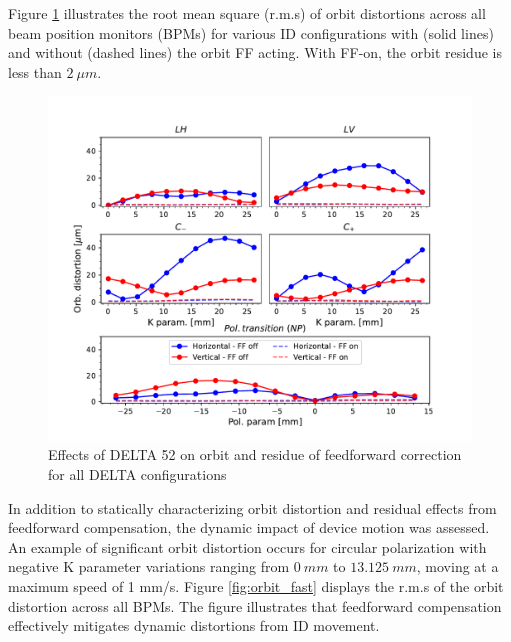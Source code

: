 \documentclass[a4paper,
               keeplastbox,   %
               ]{jacow}
\begin{document}
Figure \ref{fig:orbit_slow} illustrates the root mean square (r.m.s) of orbit distortions across all beam position monitors (BPMs) for various ID configurations with (solid lines) and without (dashed lines) the orbit FF acting. With FF-on,  the orbit residue is less than $\SI{2}{\mu m}$.

\begin{figure}[!h]
    \centering
   \includegraphics[width=\columnwidth]{Orbit_dist.pdf}
   \caption{Effects of DELTA 52 on orbit and residue of feedforward correction for all DELTA configurations}
   \label{fig:orbit_slow}
\end{figure}

In addition to statically characterizing orbit distortion and residual effects from feedforward compensation, the dynamic impact of device motion was assessed. An example of significant orbit distortion occurs for circular polarization with negative K parameter variations ranging from $\SI{0}{mm}$ to $\SI{13.125}{mm}$, moving at a maximum speed of 1 mm/s. Figure \ref{fig:orbit_fast} displays the r.m.s of the orbit distortion across all BPMs. The figure illustrates that feedforward compensation effectively mitigates dynamic distortions from ID movement.
\end{document}
